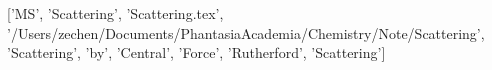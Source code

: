 ['MS', 'Scattering', 'Scattering.tex', '/Users/zechen/Documents/PhantasiaAcademia/Chemistry/Note/Scattering', 'Scattering', 'by', 'Central', 'Force', 'Rutherford', 'Scattering']
